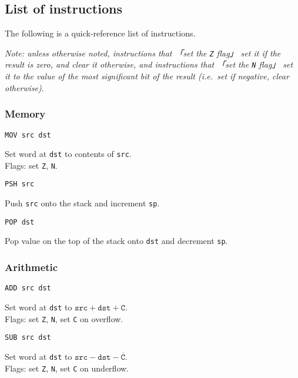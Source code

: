 \documentclass[a5paper,onecolumn,final,10pt]{memoir}
\let\ttt\texttt
\begin{document}
\footnotetext{Where \ttt{r} is \ttt{b} or \ttt{c}.}

\subsection*{List of instructions}

The following is a quick-reference list of instructions. 

\newcommand\instruction[2]{%
	\noindent
	\begin{minipage}[t]{0.22\textwidth} \texttt{#1} \end{minipage}
	\hspace{0.03\textwidth}
	\begin{minipage}[t]{0.75\textwidth} #2 \end{minipage}
	\vspace*{-0.5\smallskipamount}
}

\noindent
\textit{\small Note: unless otherwise noted, instructions that 「set the \ttt{Z} flag」 set it if the result is zero, and clear it otherwise, and instructions that 「set the \ttt{N} flag」 set it to the value of the most significant bit of the result (i.e.\ set if negative, clear otherwise)}. 
\subsubsection*{Memory}

\instruction{MOV src dst}{Set word at \texttt{dst} to contents of \texttt{src}. \\ Flags: set \ttt{Z}, \ttt{N}.}

\instruction{PSH src}{Push \ttt{src} onto the stack and increment \ttt{sp}.}

\instruction{POP dst}{Pop value on the top of the stack onto \ttt{dst} and decrement \ttt{sp}.}

\subsubsection*{Arithmetic}

\instruction{ADD src dst}{%
	Set word at \texttt{dst} to $\texttt{src}+\texttt{dst}+\ttt{C}$. \\ 
	Flags: set \ttt{Z}, \ttt{N}, set \ttt{C} on overflow. 
}

\instruction{SUB src dst}{%
	Set word at \texttt{dst} to $\texttt{src}-\texttt{dst}-\overline{\ttt{C}}$. \\ 
	Flags: set \ttt{Z}, \ttt{N}, set \ttt{C} on underflow. 
}
\end{document}
